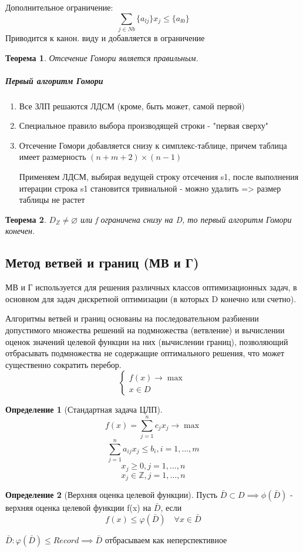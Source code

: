 \documentclass[a4paper]{article}
\newtheorem{theorem}{Теорема}[section]
\theoremstyle{definition}
\newtheorem*{definition}{Определение}
\theoremstyle{remark}
\begin{document}
Дополнительное ограничение:
\[\sum_{j\in Nb} \{a_{lj}\}x_j \leq \{a_{l0}\}\]
Приводится к канон. виду и добавляется в ограничение
\begin{theorem}
    Отсечение Гомори является правильным.
\end{theorem}
\subparagraph*{Первый алгоритм Гомори}
\begin{enumerate}
    \item Все ЗЛП решаются ЛДСМ (кроме, быть может, самой первой)
    \item Специальное правило выбора производящей строки - "первая сверху"
    \item Отсечение Гомори добавляется снизу к симплекс-таблице, причем таблица имеет размерность $(n+m+2)\times(n-1)$
    
    Применяем ЛДСМ, выбирая ведущей строку отсечения s1, после выполнения итерации строка s1 становится тривиальной - можно удалить => размер таблицы не растет
\end{enumerate}
\begin{theorem}
    $D_Z\neq \varnothing$ или f ограничена снизу на D, то первый алгоритм Гомори конечен.
\end{theorem}
\subsection{Метод ветвей и границ (МВ и Г)}
МВ и Г используется для решения различных классов оптимизационных задач, в основном для задач дискретной оптимизации (в которых D конечно или счетно).

Алгоритмы ветвей и границ основаны на последовательном разбиении допустимого множества решений на подмножества (ветвление) и вычислении оценок значений целевой функции на них (вычислении границ), позволяющий отбрасывать подмножества не содержащие оптимального решения, что может существенно сократить перебор.
\[\begin{cases}
    f(x) \to \max \\
    x\in D
\end{cases}\]
\begin{definition}[Стандартная задача ЦЛП]
    \begin{equation}
        f(x) = \sum_{j=1}^n c_j x_j \to \max
    \end{equation}
 \begin{equation}
    \sum_{j = 1}^n a_{ij}x_j \le b_i, i = 1, \dots, m 
 \end{equation}
\begin{equation}
    x_j \ge 0, j = 1, \dots, n
\end{equation}
 \begin{equation}
    x_j \in \mathbb{Z}, j =1, \dots, n 
 \end{equation}

\end{definition}
\begin{definition}[Верхняя оценка целевой функции]
    Пусть $\bar{D} \subset D \implies \phi(\bar{D})$ - верхняя оценка целевой функции f(x) на $\bar{D}$, если \[f(x)\le \varphi(\bar{D}) \quad \forall x \in \bar{D}\]
\end{definition}
$\bar{D}: \varphi(\bar{D}) \le Record \implies \bar{D}$ отбрасываем как неперспективное
\end{document}
